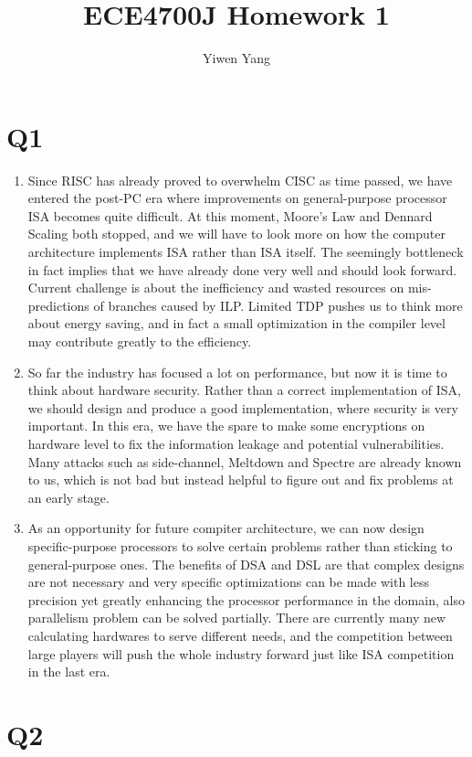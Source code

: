 \documentclass[12pt]{article}
\title{ECE4700J Homework 1}
\author{Yiwen Yang}
\begin{document}
\date{}
\maketitle

\section*{Q1}

\begin{enumerate}
	\item Since RISC has already proved to overwhelm CISC as time passed, we have entered the post-PC era where improvements on general-purpose processor ISA becomes quite difficult. At this moment, Moore’s Law and Dennard Scaling both stopped, and we will have to look more on how the computer architecture implements ISA rather than ISA itself. The seemingly bottleneck in fact implies that we have already done very well and should look forward. Current challenge is about the inefficiency and wasted resources on mis-predictions of branches caused by ILP. Limited TDP pushes us to think more about energy saving, and in fact a small optimization in the compiler level may contribute greatly to the efficiency.
	\item So far the industry has focused a lot on performance, but now it is time to think about hardware security. Rather than a correct implementation of ISA, we should design and produce a good implementation, where security is very important. In this era, we have the spare to make some encryptions on hardware level to fix the information leakage and potential vulnerabilities. Many attacks such as side-channel, Meltdown and Spectre are already known to us, which is not bad but instead helpful to figure out and fix problems at an early stage.
	\item As an opportunity for future compiter architecture, we can now design specific-purpose processors to solve certain problems rather than sticking to general-purpose ones. The benefits of DSA and DSL are that complex designs are not necessary and very specific optimizations can be made with less precision yet greatly enhancing the processor performance in the domain, also parallelism problem can be solved partially. There are currently many new calculating hardwares to serve different needs, and the competition between large players will push the whole industry forward just like ISA competition in the last era.
\end{enumerate}

\section*{Q2}
\end{document}
